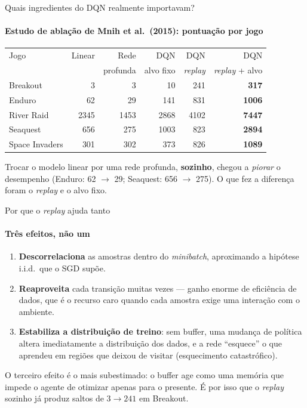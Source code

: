 \documentclass[aspectratio=169, 11pt]{beamer}
\begin{document}
\begin{frame}{Quais ingredientes do DQN realmente importavam?}
  \framesubtitle{Estudo de ablação de Mnih et al.\ (2015): pontuação por jogo}

  \begin{center}\small
  \begin{tabular}{lrrrrr}
    \toprule
    Jogo & Linear & Rede & DQN & DQN & DQN \\
         &        & profunda & alvo fixo & \emph{replay} & \emph{replay} + alvo \\
    \midrule
    Breakout       & 3    & 3    & 10   & 241  & \textbf{317} \\
    Enduro         & 62   & 29   & 141  & 831  & \textbf{1006} \\
    River Raid     & 2345 & 1453 & 2868 & 4102 & \textbf{7447} \\
    Seaquest       & 656  & 275  & 1003 & 823  & \textbf{2894} \\
    Space Invaders & 301  & 302  & 373  & 826  & \textbf{1089} \\
    \bottomrule
  \end{tabular}
  \end{center}

  \begin{alertabox}
    Trocar o modelo linear por uma rede profunda, \textbf{sozinho}, chegou
    a \emph{piorar} o desempenho (Enduro: 62 $\to$ 29; Seaquest: 656 $\to$
    275). O que fez a diferença foram o \emph{replay} e o alvo fixo.
  \end{alertabox}

\end{frame}

\begin{frame}{Por que o \emph{replay} ajuda tanto}
  \framesubtitle{Três efeitos, não um}

  \begin{enumerate}\setlength{\itemsep}{0.5ex}
    \item \textbf{Descorrelaciona} as amostras dentro do \emph{minibatch},
      aproximando a hipótese i.i.d.\ que o SGD supõe.
    \item \textbf{Reaproveita} cada transição muitas vezes --- ganho enorme
      de eficiência de dados, que é o recurso caro quando cada amostra
      exige uma interação com o ambiente.
    \item \textbf{Estabiliza a distribuição de treino}: sem buffer, uma
      mudança de política altera imediatamente a distribuição dos dados,
      e a rede ``esquece'' o que aprendeu em regiões que deixou de visitar
      (esquecimento catastrófico).
  \end{enumerate}

  \begin{ideiabox}
    O terceiro efeito é o mais subestimado: o buffer age como uma memória
    que impede o agente de otimizar apenas para o presente. É por isso que
    o \emph{replay} sozinho já produz saltos de $3 \to 241$ em Breakout.
  \end{ideiabox}
\end{frame}
\end{document}
